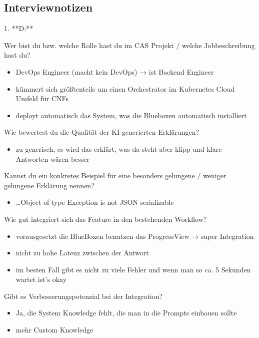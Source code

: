 \documentclass[
  a4paper,
  12pt,
  oneside,
  open=any,
  BCOR=12mm,
  DIV=14,
  parskip=half*,
  headsepline,
  footsepline,
  pointlessnumbers,
  liststotoc,
  numbers=noenddot,
  listof=totoc]{scrartcl}
\providecommand{\tightlist}{%
  \setlength{\itemsep}{0pt}\setlength{\parskip}{0pt}}\usepackage{longtable,booktabs,array}
\begin{document}
\newpage

\subsection{Interviewnotizen}\label{interviewnotizen}

1. **D:**

Wer bist du bzw. welche Rolle hast du im CAS Projekt / welche
Jobbeschreibung hast du?

\begin{itemize}
\tightlist
\item
  DevOps Engineer (macht kein DevOps) → ist Backend Engineer
\item
  kümmert sich größtenteils um einen Orchestrator im Kubernetes Cloud
  Umfeld für CNFs
\item
  deployt automatisch das System, was die Blueboxen automatisch
  installiert
\end{itemize}

Wie bewertest du die Qualität der KI-generierten Erklärungen?

\begin{itemize}
\tightlist
\item
  zu generisch, es wird das erklärt, was da steht aber klipp und klare
  Antworten wären besser
\end{itemize}

Kannst du ein konkretes Beispiel für eine besonders gelungene / weniger
gelungene Erklärung nennen?

\begin{itemize}
\tightlist
\item
  \ldots Object of type Exception is not JSON serializable
\end{itemize}

Wie gut integriert sich das Feature in den bestehenden Workflow?

\begin{itemize}
\tightlist
\item
  vorausgesetzt die BlueBoxen benutzen das ProgressView → super
  Integration
\item
  nicht zu hohe Latenz zwischen der Antwort
\item
  im besten Fall gibt es nicht zu viele Fehler und wenn man so ca. 5
  Sekunden wartet ist's okay
\end{itemize}

Gibt es Verbesserungspotenzial bei der Integration?

\begin{itemize}
\tightlist
\item
  Ja, die System Knowledge fehlt, die man in die Prompts einbauen sollte
\item
  mehr Custom Knowledge
\end{itemize}
\end{document}

